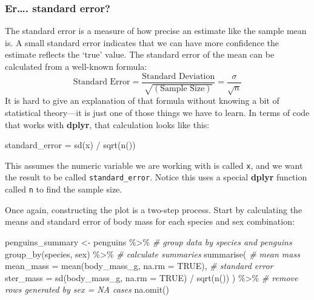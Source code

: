 \documentclass[
]{book}
\newenvironment{Shaded}{\begin{snugshade}}{\end{snugshade}}
\newcommand{\AttributeTok}[1]{\textcolor[rgb]{0.77,0.63,0.00}{#1}}
\newcommand{\CommentTok}[1]{\textcolor[rgb]{0.56,0.35,0.01}{\textit{#1}}}
\newcommand{\ConstantTok}[1]{\textcolor[rgb]{0.00,0.00,0.00}{#1}}
\newcommand{\FunctionTok}[1]{\textcolor[rgb]{0.00,0.00,0.00}{#1}}
\newcommand{\NormalTok}[1]{#1}
\newcommand{\OtherTok}[1]{\textcolor[rgb]{0.56,0.35,0.01}{#1}}
\newcommand{\SpecialCharTok}[1]{\textcolor[rgb]{0.00,0.00,0.00}{#1}}
\newenvironment{greybox}{
  \definecolor{shadecolor}{rgb}{0.95,0.95,0.95}  %
  \color{black}
  \begin{shaded}}
 {\end{shaded}}
\newenvironment{infobox}[1]
  {
  \begin{itemize}
  \renewcommand{\labelitemi}{
    \raisebox{-.7\height}[0pt][0pt]{
      {\setkeys{Gin}{width=3em,keepaspectratio}
        \texttt{[image: images/\#1]}}
    }
  }
  \setlength{\fboxsep}{1em}
  \begin{greybox}
  \item
  }
  {
  \end{greybox}
  \end{itemize}
  }
\begin{document}
\begin{infobox}{information}

\hypertarget{er.-standard-error}{%
\subsubsection*{Er\ldots. standard error?}\label{er.-standard-error}}

The standard error is a measure of how precise an estimate like the sample mean is. A small standard error indicates that we can have more confidence the estimate reflects the `true' value. The standard error of the mean can be calculated from a well-known formula: \[
\text{Standard Error} = \frac{\text{Standard Deviation}}{\sqrt{(\text{Sample Size})}} = \frac{\sigma}{\sqrt{n}}
\] It is hard to give an explanation of that formula without knowing a bit of statistical theory---it is just one of those things we have to learn. In terms of code that works with \textbf{dplyr}, that calculation looks like this:

\begin{Shaded}
\begin{Highlighting}[]
\NormalTok{standard\_error }\OtherTok{=} \FunctionTok{sd}\NormalTok{(x) }\SpecialCharTok{/} \FunctionTok{sqrt}\NormalTok{(}\FunctionTok{n}\NormalTok{())}
\end{Highlighting}
\end{Shaded}

This assumes the numeric variable we are working with is called \texttt{x}, and we want the result to be called \texttt{standard\_error}. Notice this uses a special \textbf{dplyr} function called \texttt{n} to find the sample size.

\end{infobox}

Once again, constructing the plot is a two-step process. Start by calculating the means and standard error of body mass for each species and sex combination:

\begin{Shaded}
\begin{Highlighting}[]
\NormalTok{penguins\_summary }\OtherTok{\textless{}{-}}\NormalTok{ penguins }\SpecialCharTok{\%\textgreater{}\%} 
  \CommentTok{\# group data by species and penguins}
  \FunctionTok{group\_by}\NormalTok{(species, sex) }\SpecialCharTok{\%\textgreater{}\%} 
  \CommentTok{\# calculate summaries}
  \FunctionTok{summarise}\NormalTok{(}
    \CommentTok{\# mean mass}
    \AttributeTok{mean\_mass =} \FunctionTok{mean}\NormalTok{(body\_mass\_g, }\AttributeTok{na.rm =} \ConstantTok{TRUE}\NormalTok{),}
    \CommentTok{\# standard error}
    \AttributeTok{ster\_mass =} \FunctionTok{sd}\NormalTok{(body\_mass\_g, }\AttributeTok{na.rm =} \ConstantTok{TRUE}\NormalTok{) }\SpecialCharTok{/} \FunctionTok{sqrt}\NormalTok{(}\FunctionTok{n}\NormalTok{())}
\NormalTok{  ) }\SpecialCharTok{\%\textgreater{}\%} 
  \CommentTok{\# remove rows generated by sex = NA cases}
  \FunctionTok{na.omit}\NormalTok{()}
\end{Highlighting}
\end{Shaded}
\end{document}
